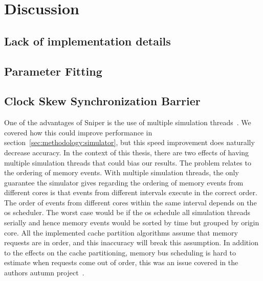 
\chapter{Discussion}
\label{cpt:discussion}


\section{Lack of implementation details}


\section{Parameter Fitting}



\section{Clock Skew Synchronization Barrier}

One of the advantages of Sniper is the use of multiple simulation threads~\cite{Carlson2011a}.
We covered how this could improve performance in section~\ref{sec:methodology:simulator}, but this speed improvement does naturally decrease accuracy.
In the context of this thesis, there are two effects of having multiple
simulation threads that could bias our results.
The problem relates to the ordering of memory events.
With multiple simulation threads, the only guarantee the simulator gives regarding the ordering of memory events from different cores is that events from different intervals execute in the correct order.
The order of events from different cores within the same interval depends on the os scheduler.
The worst case would be if the os schedule all simulation threads serially and hence memory events would be sorted by time but grouped by origin core.
All the implemented cache partition algorithms assume that memory requests are in order, and this inaccuracy will break this assumption.
In addition to the effects on the cache partitioning, memory bus scheduling is hard to estimate when requests come out of order, this was an issue covered in the authors autumn project~\cite{Olsen2014}.

